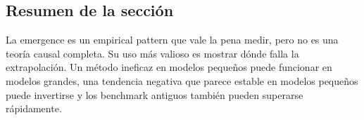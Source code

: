 \subsection{Resumen de la sección}

La emergence es un empirical pattern que vale la pena medir, pero no es una teoría causal completa. Su uso más valioso es mostrar dónde falla la extrapolación. Un método ineficaz en modelos pequeños puede funcionar en modelos grandes, una tendencia negativa que parece estable en modelos pequeños puede invertirse y los benchmark antiguos también pueden superarse rápidamente.
